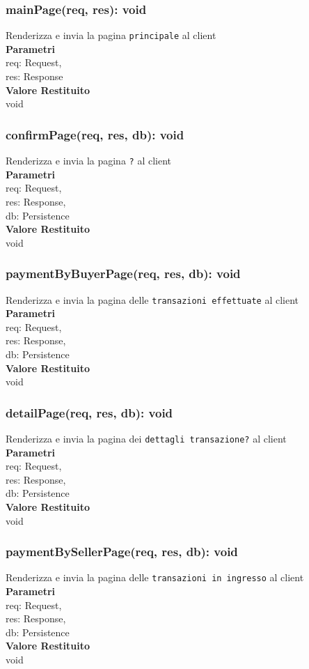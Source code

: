\documentclass[a4paper, 12pt]{article}
\begin{document}
\subsubsection{mainPage(req, res): void}
Renderizza e invia la pagina \texttt{principale} al client\\
\textbf{Parametri}\\
req: Request,\\
res: Response\\
\textbf{Valore Restituito}\\
void
\subsubsection{confirmPage(req, res, db): void}
Renderizza e invia la pagina \texttt{?} al client\\
\textbf{Parametri}\\
req: Request,\\
res: Response,\\
db: Persistence\\
\textbf{Valore Restituito}\\
void
\subsubsection{paymentByBuyerPage(req, res, db): void}
Renderizza e invia la pagina delle \texttt{transazioni effettuate} al client\\
\textbf{Parametri}\\
req: Request,\\
res: Response,\\
db: Persistence\\
\textbf{Valore Restituito}\\
void
\subsubsection{detailPage(req, res, db): void}
Renderizza e invia la pagina dei \texttt{dettagli transazione?} al client\\
\textbf{Parametri}\\
req: Request,\\
res: Response,\\
db: Persistence\\
\textbf{Valore Restituito}\\
void
\subsubsection{paymentBySellerPage(req, res, db): void}
Renderizza e invia la pagina delle \texttt{transazioni in ingresso} al client\\
\textbf{Parametri}\\
req: Request,\\
res: Response,\\
db: Persistence\\
\textbf{Valore Restituito}\\
void
\end{document}
